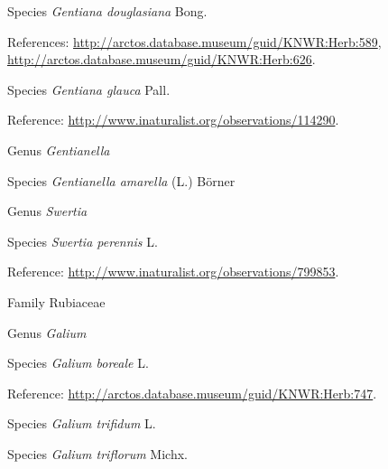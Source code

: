 \documentclass[9pt, article]{memoir}
\begin{document}
\begin{multicols}{2}
\vspace{6pt}\noindent\hspace{36pt}Species \textit{Gentiana douglasiana} Bong.


\vspace{6pt}References: 
\url{http://arctos.database.museum/guid/KNWR:Herb:589}, 
\url{http://arctos.database.museum/guid/KNWR:Herb:626}.

\vspace{6pt}\noindent\hspace{36pt}Species \textit{Gentiana glauca} Pall.


\vspace{6pt}Reference: 
\url{http://www.inaturalist.org/observations/114290}.

\vspace{6pt}\noindent\hspace{30pt}Genus \textit{Gentianella}


\vspace{6pt}\noindent\hspace{36pt}Species \textit{Gentianella amarella} (L.) Börner


\vspace{6pt}\noindent\hspace{30pt}Genus \textit{Swertia}


\vspace{6pt}\noindent\hspace{36pt}Species \textit{Swertia perennis} L.


\vspace{6pt}Reference: 
\url{http://www.inaturalist.org/observations/799853}.

\vspace{6pt}\noindent\hspace{24pt}Family Rubiaceae


\vspace{6pt}\noindent\hspace{30pt}Genus \textit{Galium}


\vspace{6pt}\noindent\hspace{36pt}Species \textit{Galium boreale} L.


\vspace{6pt}Reference: 
\url{http://arctos.database.museum/guid/KNWR:Herb:747}.

\vspace{6pt}\noindent\hspace{36pt}Species \textit{Galium trifidum} L.


\vspace{6pt}\noindent\hspace{36pt}Species \textit{Galium triflorum} Michx.



\end{multicols}
\end{document}
